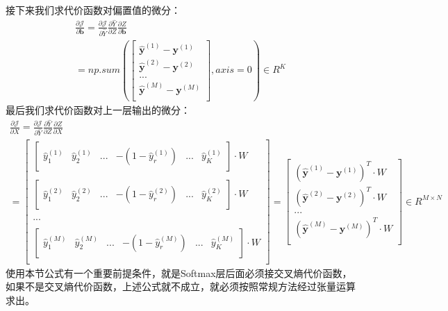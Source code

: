 \documentclass[UTF8]{article}
\begin{document}
接下来我们求代价函数对偏置值的微分：
\begin{equation}
\begin{aligned}
\frac{\partial{\mathcal{J}}}{\partial{\boldsymbol{b}}}=\frac{\partial{\mathcal{J}}}{\partial{\hat{Y}}} \frac{\partial{\hat{Y}}}{\partial{Z}} \frac{\partial{Z}}{\partial{\boldsymbol{b}}} \\
 =np.sum(
\begin{bmatrix}
\hat{\boldsymbol{y}}^{(1)}-\boldsymbol{y}^{(1)} \\
\hat{\boldsymbol{y}}^{(2)}-\boldsymbol{y}^{(2)} \\
... \\
\hat{\boldsymbol{y}}^{(M)}-\boldsymbol{y}^{(M)} \\
\end{bmatrix}, axis=0) \in R^{K}
\end{aligned}
\label{mlp-pJ-pb-def}
\end{equation}
最后我们求代价函数对上一层输出的微分：
\begin{equation}
\begin{aligned}
\frac{\partial{\mathcal{J}}}{\partial{X}}=\frac{\partial{\mathcal{J}}}{\partial{\hat{Y}}} \frac{\partial{\hat{Y}}}{\partial{Z}} \frac{\partial{Z}}{\partial{X}} \\
 =\begin{bmatrix}
\begin{bmatrix}
 \hat{y}_{1}^{(1)} & \hat{y}_{2}^{(1)} & ... & -(1-\hat{y}_{r}^{(1)}) & ... & \hat{y}_{K}^{(1)}
 \end{bmatrix} \cdot W \\ \\
\begin{bmatrix}
 \hat{y}_{1}^{(2)} & \hat{y}_{2}^{(2)} & ... & -(1-\hat{y}_{r}^{(2)}) & ... & \hat{y}_{K}^{(2)}
 \end{bmatrix} \cdot W \\ \\
 ... \\ \\
 \begin{bmatrix}
 \hat{y}_{1}^{(M)} & \hat{y}_{2}^{(M)} & ... & -(1-\hat{y}_{r}^{(M)}) & ... & \hat{y}_{K}^{(M)}
 \end{bmatrix} \cdot W \\
\end{bmatrix}
 =\begin{bmatrix}
(\hat{\boldsymbol{y}}^{(1)}-\boldsymbol{y}^{(1)})^{T} \cdot W \\
(\hat{\boldsymbol{y}}^{(2)}-\boldsymbol{y}^{(2)})^{T} \cdot W \\
... \\
(\hat{\boldsymbol{y}}^{(M)}-\boldsymbol{y}^{(M)})^{T} \cdot W \\
\end{bmatrix}
\in R^{M \times N}
\end{aligned}
\label{mlp-pJ-pX-def}
\end{equation}
使用本节公式有一个重要前提条件，就是Softmax层后面必须接交叉熵代价函数，如果不是交叉熵代价函数，上述公式就不成立，就必须按照常规方法经过张量运算求出。
\end{document}
